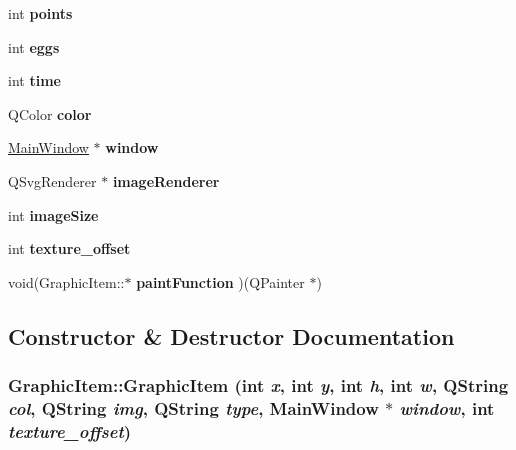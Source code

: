 \begin{DoxyCompactItemize}
\item 
\hypertarget{classGraphicItem_a2fb8006302b93e7e5c780625c1e9ba14}{
int {\bfseries points}}
\label{classGraphicItem_a2fb8006302b93e7e5c780625c1e9ba14}

\item 
\hypertarget{classGraphicItem_ae630919d6b242649d1ccd7800a8da4ce}{
int {\bfseries eggs}}
\label{classGraphicItem_ae630919d6b242649d1ccd7800a8da4ce}

\item 
\hypertarget{classGraphicItem_a7fc83a3e78e3ad42162c0aa48aa71206}{
int {\bfseries time}}
\label{classGraphicItem_a7fc83a3e78e3ad42162c0aa48aa71206}

\item 
\hypertarget{classGraphicItem_a91971a6e6c54311b6e6465b59736f9d0}{
QColor {\bfseries color}}
\label{classGraphicItem_a91971a6e6c54311b6e6465b59736f9d0}

\item 
\hypertarget{classGraphicItem_ae992094d2543bab88d8a93acf548eae8}{
\hyperlink{classMainWindow}{MainWindow} $\ast$ {\bfseries window}}
\label{classGraphicItem_ae992094d2543bab88d8a93acf548eae8}

\item 
\hypertarget{classGraphicItem_ab75d78cf71868c2e861569406c694b99}{
QSvgRenderer $\ast$ {\bfseries imageRenderer}}
\label{classGraphicItem_ab75d78cf71868c2e861569406c694b99}

\item 
\hypertarget{classGraphicItem_aa027eaadfaf0dd974eb07cc1b67bf949}{
int {\bfseries imageSize}}
\label{classGraphicItem_aa027eaadfaf0dd974eb07cc1b67bf949}

\item 
\hypertarget{classGraphicItem_a060d774f3af42c3eeb10d3dcd4cdddd5}{
int {\bfseries texture\_\-offset}}
\label{classGraphicItem_a060d774f3af42c3eeb10d3dcd4cdddd5}

\item 
\hypertarget{classGraphicItem_aea38603beb906154f5205691af7935f3}{
void(GraphicItem::$\ast$ {\bfseries paintFunction} )(QPainter $\ast$)}
\label{classGraphicItem_aea38603beb906154f5205691af7935f3}

\end{DoxyCompactItemize}


\subsection{Constructor \& Destructor Documentation}
\hypertarget{classGraphicItem_ae39c9ddf5168c365138540e010ca6d8f}{
\subsubsection[{GraphicItem}]{\setlength{\rightskip}{0pt plus 5cm}GraphicItem::GraphicItem (int {\em x}, \/  int {\em y}, \/  int {\em h}, \/  int {\em w}, \/  QString {\em col}, \/  QString {\em img}, \/  QString {\em type}, \/  {\bf MainWindow} $\ast$ {\em window}, \/  int {\em texture\_\-offset})}}
\label{classGraphicItem_ae39c9ddf5168c365138540e010ca6d8f}


